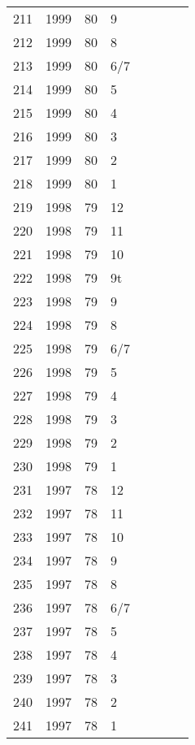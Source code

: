 \begin{longtable}{ |l|l|l|l|l|l|l|l| }
211 & 1999 & 80 &     9 &         &  &  & \\
212 & 1999 & 80 &     8 &         &  &  & \\
213 & 1999 & 80 &   6/7 &         &  &  & \\
214 & 1999 & 80 &     5 &         &  &  & \\
215 & 1999 & 80 &     4 &         &  &  & \\
216 & 1999 & 80 &     3 &         &  &  & \\
217 & 1999 & 80 &     2 &         &  &  & \\
218 & 1999 & 80 &     1 &         &  &  & \\
219 & 1998 & 79 &    12 &         &  &  & \\
220 & 1998 & 79 &    11 &         &  &  & \\
221 & 1998 & 79 &    10 &         &  &  & \\
222 & 1998 & 79 &    9t &         &  &  & \\
223 & 1998 & 79 &     9 &         &  &  & \\
224 & 1998 & 79 &     8 &         &  &  & \\
225 & 1998 & 79 &   6/7 &         &  &  & \\
226 & 1998 & 79 &     5 &         &  &  & \\
227 & 1998 & 79 &     4 &         &  &  & \\
228 & 1998 & 79 &     3 &         &  &  & \\
229 & 1998 & 79 &     2 &         &  &  & \\
230 & 1998 & 79 &     1 &         &  &  & \\
231 & 1997 & 78 &    12 &         &  &  & \\
232 & 1997 & 78 &    11 &         &  &  & \\
233 & 1997 & 78 &    10 &         &  &  & \\
234 & 1997 & 78 &     9 &         &  &  & \\
235 & 1997 & 78 &     8 &         &  &  & \\
236 & 1997 & 78 &   6/7 &         &  &  & \\
237 & 1997 & 78 &     5 &         &  &  & \\
238 & 1997 & 78 &     4 &         &  &  & \\
239 & 1997 & 78 &     3 &         &  &  & \\
240 & 1997 & 78 &     2 &         &  &  & \\
241 & 1997 & 78 &     1 &         &                &  & \\

\end{longtable}
